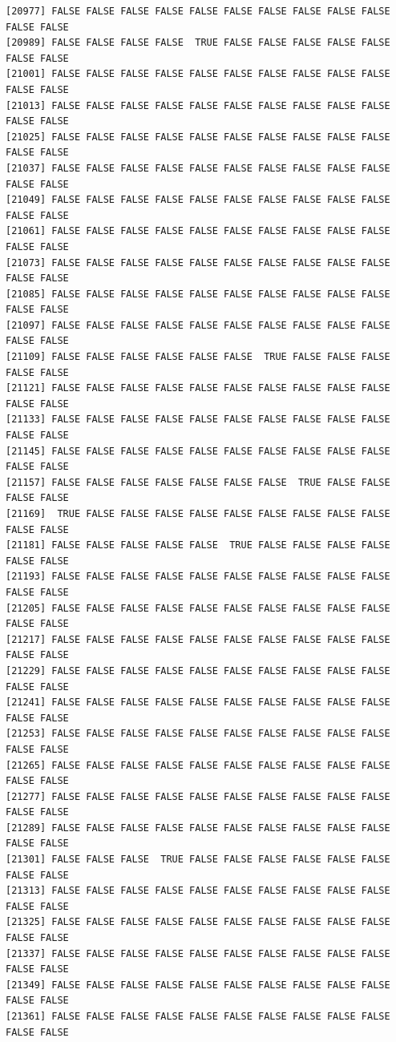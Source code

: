 \documentclass[
  a4paper,
  DIV=11,
  numbers=noendperiod]{scrartcl}
\begin{document}
\begin{verbatim}
[20977] FALSE FALSE FALSE FALSE FALSE FALSE FALSE FALSE FALSE FALSE FALSE FALSE
[20989] FALSE FALSE FALSE FALSE  TRUE FALSE FALSE FALSE FALSE FALSE FALSE FALSE
[21001] FALSE FALSE FALSE FALSE FALSE FALSE FALSE FALSE FALSE FALSE FALSE FALSE
[21013] FALSE FALSE FALSE FALSE FALSE FALSE FALSE FALSE FALSE FALSE FALSE FALSE
[21025] FALSE FALSE FALSE FALSE FALSE FALSE FALSE FALSE FALSE FALSE FALSE FALSE
[21037] FALSE FALSE FALSE FALSE FALSE FALSE FALSE FALSE FALSE FALSE FALSE FALSE
[21049] FALSE FALSE FALSE FALSE FALSE FALSE FALSE FALSE FALSE FALSE FALSE FALSE
[21061] FALSE FALSE FALSE FALSE FALSE FALSE FALSE FALSE FALSE FALSE FALSE FALSE
[21073] FALSE FALSE FALSE FALSE FALSE FALSE FALSE FALSE FALSE FALSE FALSE FALSE
[21085] FALSE FALSE FALSE FALSE FALSE FALSE FALSE FALSE FALSE FALSE FALSE FALSE
[21097] FALSE FALSE FALSE FALSE FALSE FALSE FALSE FALSE FALSE FALSE FALSE FALSE
[21109] FALSE FALSE FALSE FALSE FALSE FALSE  TRUE FALSE FALSE FALSE FALSE FALSE
[21121] FALSE FALSE FALSE FALSE FALSE FALSE FALSE FALSE FALSE FALSE FALSE FALSE
[21133] FALSE FALSE FALSE FALSE FALSE FALSE FALSE FALSE FALSE FALSE FALSE FALSE
[21145] FALSE FALSE FALSE FALSE FALSE FALSE FALSE FALSE FALSE FALSE FALSE FALSE
[21157] FALSE FALSE FALSE FALSE FALSE FALSE FALSE  TRUE FALSE FALSE FALSE FALSE
[21169]  TRUE FALSE FALSE FALSE FALSE FALSE FALSE FALSE FALSE FALSE FALSE FALSE
[21181] FALSE FALSE FALSE FALSE FALSE  TRUE FALSE FALSE FALSE FALSE FALSE FALSE
[21193] FALSE FALSE FALSE FALSE FALSE FALSE FALSE FALSE FALSE FALSE FALSE FALSE
[21205] FALSE FALSE FALSE FALSE FALSE FALSE FALSE FALSE FALSE FALSE FALSE FALSE
[21217] FALSE FALSE FALSE FALSE FALSE FALSE FALSE FALSE FALSE FALSE FALSE FALSE
[21229] FALSE FALSE FALSE FALSE FALSE FALSE FALSE FALSE FALSE FALSE FALSE FALSE
[21241] FALSE FALSE FALSE FALSE FALSE FALSE FALSE FALSE FALSE FALSE FALSE FALSE
[21253] FALSE FALSE FALSE FALSE FALSE FALSE FALSE FALSE FALSE FALSE FALSE FALSE
[21265] FALSE FALSE FALSE FALSE FALSE FALSE FALSE FALSE FALSE FALSE FALSE FALSE
[21277] FALSE FALSE FALSE FALSE FALSE FALSE FALSE FALSE FALSE FALSE FALSE FALSE
[21289] FALSE FALSE FALSE FALSE FALSE FALSE FALSE FALSE FALSE FALSE FALSE FALSE
[21301] FALSE FALSE FALSE  TRUE FALSE FALSE FALSE FALSE FALSE FALSE FALSE FALSE
[21313] FALSE FALSE FALSE FALSE FALSE FALSE FALSE FALSE FALSE FALSE FALSE FALSE
[21325] FALSE FALSE FALSE FALSE FALSE FALSE FALSE FALSE FALSE FALSE FALSE FALSE
[21337] FALSE FALSE FALSE FALSE FALSE FALSE FALSE FALSE FALSE FALSE FALSE FALSE
[21349] FALSE FALSE FALSE FALSE FALSE FALSE FALSE FALSE FALSE FALSE FALSE FALSE
[21361] FALSE FALSE FALSE FALSE FALSE FALSE FALSE FALSE FALSE FALSE FALSE FALSE

\end{verbatim}
\end{document}
